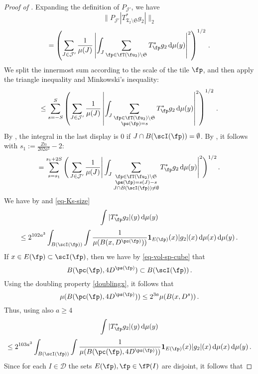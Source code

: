 \begin{proof}[Proof of ]
    Expanding the definition of $P_{\mathcal{J}'}$, we have
    $$
        \|P_{\mathcal{J}'}|T_{\mathfrak{T}_2 \setminus \mathfrak{S}}^* g_2|\|_2
    $$
    $$
        = \left(\sum_{J \in \mathcal{J}'} \frac{1}{\mu(J)} \left|\int_J \sum_{\fp \in \fT(\fu_2) \setminus \mathfrak{S}} T_{\fp}^* g_2 \, \mathrm{d}\mu(y) \right|^2 \right)^{1/2}\,.
    $$
    We split the innermost sum according to the scale of the tile $\fp$, and then apply the triangle inequality and Minkowski's inequality:
    $$
        \le \sum_{s = -S}^S \left( \sum_{J \in \mathcal{J}'} \frac{1}{\mu(J)} \left|\int_J \sum_{\substack{\fp \in \fT(\fu_2) \setminus \mathfrak{S}\\ \ps(\fp) = s}} T_{\fp}^* g_2 \, \mathrm{d}\mu(y) \right|^2\right)^{1/2}\,.
    $$
    By , the integral in the last display is $0$ if $J \cap B(\scI(\fp)) = \emptyset$. By , it follows with $s_1 := \frac{Zn}{202a^3} - 2$:
    \begin{equation}
    \label{eq-sep-tree-small-1}
        = \sum_{s = s_1}^{s_1 + 2S} \Bigg( \sum_{J \in \mathcal{J}'} \frac{1}{\mu(J)} \Bigg|\int_J \sum_{\substack{\fp \in \fT(\fu_2) \setminus \mathfrak{S}\\ \ps(\fp) = s(J) - s\\
        J \cap B(\scI(\fp)) \ne \emptyset}} T_{\fp}^* g_2 \, \mathrm{d}\mu(y) \Bigg|^2\Bigg)^{1/2}\,.
    \end{equation}
    We have by  and \eqref{eq-Ks-size}
    $$
        \int |T_{\fp}^* g_2|(y) \, \mathrm{d}\mu(y)
    $$
    $$
        \le 2^{102a^3} \int_{B(\scI(\fp))} \int \frac{1}{\mu(B(x, D^{\ps(\fp)}))} \mathbf{1}_{E(\fp)}(x) |g_2|(x) \, \mathrm{d}\mu(x) \, \mathrm{d}\mu(y)\,.
    $$
    If $x \in E(\fp) \subset \scI(\fp)$, then we have by \eqref{eq-vol-sp-cube} that
    $$
        B(\pc(\fp), 4D^{\ps(\fp)}) \subset B(\scI(\fp))\,.
    $$
    Using the doubling property \eqref{doublingx}, it follows that
    $$
        \mu(B(\pc(\fp), 4D^{\ps(\fp)})) \le 2^{3a} \mu(B(x, D^s))\,.
    $$
    Thus, using also $a \ge 4$
    $$
        \int |T_{\fp}^* g_2|(y) \, \mathrm{d}\mu(y)
    $$
    $$
        \le 2^{103 a^3} \int_{B(\scI(\fp))} \int \frac{1}{\mu(B(\pc(\fp), 4D^{\ps(\fp)}))} \mathbf{1}_{E(\fp)}(x) |g_2|(x) \, \mathrm{d}\mu(x) \, \mathrm{d}\mu(y)\,.
    $$
    Since for each $I \in \mathcal{D}$ the sets $E(\fp), \fp \in \fP(I)$ are disjoint, it follows that

\end{proof}

